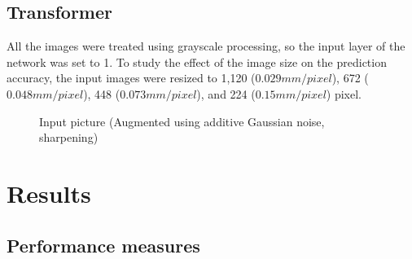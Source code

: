 \documentclass{proc-a4}
\begin{document}
\subsection{Transformer}
All the images were treated using grayscale processing, so the input layer of the network was set to 1. To study the effect of the image size on the prediction accuracy, the input images were resized to 1,120 ($0.029 mm/pixel$), 672 ($0.048 mm/pixel$), 448 ($0.073 mm/pixel$), and 224 ($0.15 mm/pixel$) pixel. 

\begin{figure*}
\centering
{}
    \caption{Input picture (Augmented using additive Gaussian noise, sharpening)}
    \label{fig-inpaug}
\end{figure*}



\section{Results}

\subsection{Performance measures}
\end{document}
